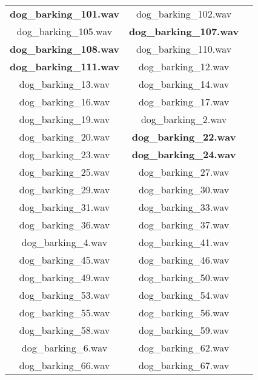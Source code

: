 \documentclass[twocolumn,10pt]{asme2ej}
\begin{document}
\begin{table}[h]
  \begin{tabular}{ccc}
\textbf{dog\_barking\_101.wav} & dog\_barking\_102.wav\\
dog\_barking\_105.wav & \textbf{dog\_barking\_107.wav}\\
\textbf{dog\_barking\_108.wav} & dog\_barking\_110.wav\\
\textbf{dog\_barking\_111.wav} & dog\_barking\_12.wav\\
dog\_barking\_13.wav & dog\_barking\_14.wav\\
dog\_barking\_16.wav & dog\_barking\_17.wav\\
dog\_barking\_19.wav & dog\_barking\_2.wav\\
dog\_barking\_20.wav & \textbf{dog\_barking\_22.wav}\\
dog\_barking\_23.wav & \textbf{dog\_barking\_24.wav}\\
dog\_barking\_25.wav & dog\_barking\_27.wav\\
dog\_barking\_29.wav & dog\_barking\_30.wav\\
dog\_barking\_31.wav & dog\_barking\_33.wav\\
dog\_barking\_36.wav & dog\_barking\_37.wav\\
dog\_barking\_4.wav & dog\_barking\_41.wav\\
dog\_barking\_45.wav & dog\_barking\_46.wav\\
dog\_barking\_49.wav & dog\_barking\_50.wav\\
dog\_barking\_53.wav & dog\_barking\_54.wav\\
dog\_barking\_55.wav & dog\_barking\_56.wav\\
dog\_barking\_58.wav & dog\_barking\_59.wav\\
dog\_barking\_6.wav & dog\_barking\_62.wav\\
dog\_barking\_66.wav & dog\_barking\_67.wav\\
\end{tabular}
\end{table}
\end{document}
